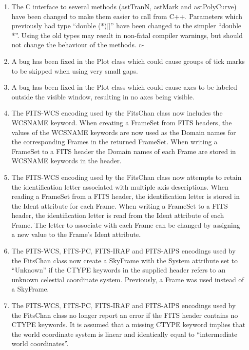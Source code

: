 \documentclass[twoside,11pt]{starlink}
\begin{document}
\begin{enumerate}

c+
\item The C interface to several methods (astTranN, astMark and
astPolyCurve) have been changed to make them easier to call from C++.
Parameters which previously had type ``double (*)[]'' have been changed
to the simpler ``double *''. Using the old types may result in non-fatal
compiler warnings, but should not change the behaviour of the methods.
c-

\item A bug has been fixed in the Plot class which could cause groups
of tick marks to be skipped when using very small gaps.

\item A bug has been fixed in the Plot class which could cause axes to be
labeled outside the visible window, resulting in no axes being visible.

\item The FITS-WCS encoding used by the FitsChan class now includes the
WCSNAME keyword. When creating a FrameSet from FITS headers, the values of
the WCSNAME keywords are now used as the Domain names for the corresponding
Frames in the returned FrameSet. When writing a FrameSet to a FITS header
the Domain names of each Frame are stored in WCSNAME keywords in the
header.

\item The FITS-WCS encoding used by the FitsChan class now attempts to
retain the identification letter associated with multiple axis
descriptions. When reading a FrameSet from a FITS header, the identification
letter is stored in the Ident attribute for each Frame. When writing a
FrameSet to a FITS header, the identification letter is read from the
Ident attribute of each Frame. The letter to associate with each Frame
can be changed by assigning a new value to the Frame's Ident attribute.

\item The FITS-WCS, FITS-PC, FITS-IRAF and FITS-AIPS encodings used by the
FitsChan class now create a SkyFrame with the System attribute set to
``Unknown'' if the CTYPE keywords in the supplied header refers to an
unknown celestial coordinate system. Previously, a Frame was used instead
of a SkyFrame.

\item The FITS-WCS, FITS-PC, FITS-IRAF and FITS-AIPS encodings used by the
FitsChan class no longer report an error if the FITS header contains no
CTYPE keywords. It is assumed that a missing CTYPE keyword implies that
the world coordinate system is linear and identically equal to
``intermediate world coordinates''.


\end{enumerate}
\end{document}
